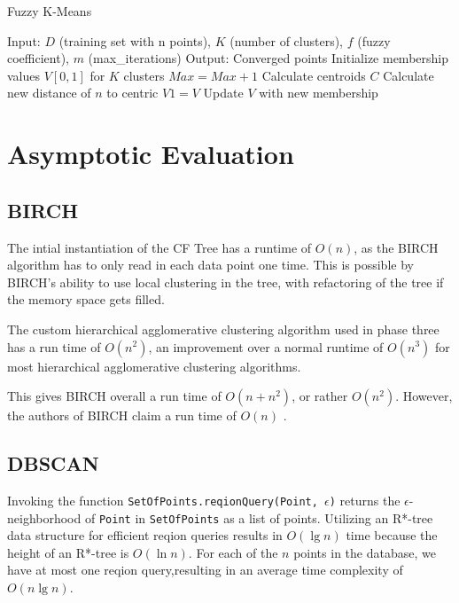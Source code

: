 \documentclass[conference, 10pt]{IEEEtran}
\begin{document}
\begin{algorithm}
\caption{Fuzzy K-Means}
\begin{algorithmic}[1]
\State Input: $D$ (training set with n points), $K$ (number of clusters), $f$ (fuzzy coefficient), $m$ (max\_iterations)
\State Output: Converged points
  \State Initialize membership values $V[0,1]$ for $K$ clusters
  \State $Max=Max+1$
        \State Calculate centroids $C$
        \State Calculate new distance of $n$ to centric
        \State $V1 = V$
        \State Update $V$ with new membership
    \EndFor
  \EndFor
\EndProcedure
\Statex
\end{algorithmic}
\end{algorithm}


\section{Asymptotic Evaluation}

\subsection{BIRCH}
The intial instantiation of the CF Tree has a runtime of $O(n)$, as the BIRCH algorithm has to only read in each data point one time. This is possible by BIRCH's ability to use local clustering in the tree, with refactoring of the tree if the memory space gets filled.

The custom hierarchical agglomerative clustering algorithm used in phase three has a run time of $O(n^2)$, an improvement over a normal runtime of $O(n^3)$ for most hierarchical agglomerative clustering algorithms.

This gives BIRCH overall a run time of $O(n+n^2)$, or rather $O(n^2)$. However, the authors of BIRCH claim a run time of $O(n)$ \cite{birch}.
\subsection{DBSCAN}

Invoking the function \texttt{SetOfPoints.reqionQuery(Point, $\epsilon$)} returns the $\epsilon$-neighborhood of \texttt{Point} in \texttt{SetOfPoints} as a list of points. Utilizing an R*-tree data structure for efficient reqion queries results in $O(\lg{n})$ time because the height of an R*-tree is $O(\ln{n})$. For each of the $n$ points in the database, we have at most one reqion query,resulting in an average time complexity of $O(n \lg{n})$. \cite{dbscan}
\end{document}
